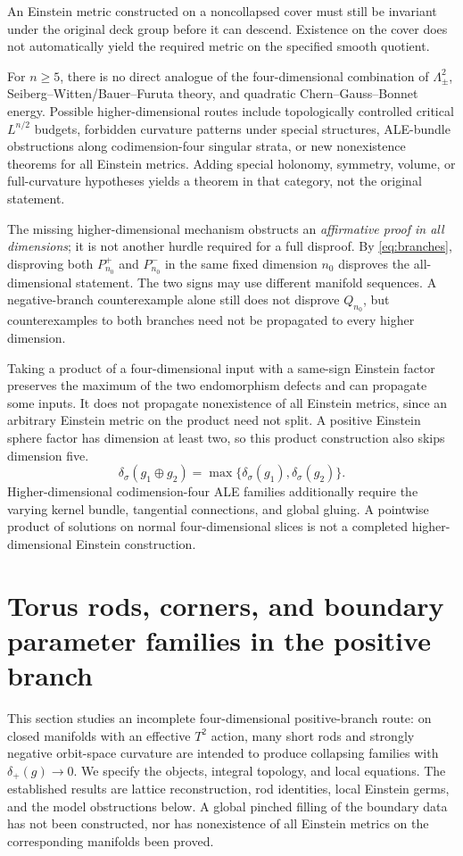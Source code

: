 \documentclass[a4paper,11pt]{article}
\numberwithin{equation}{section}
\theoremstyle{definition}
\begin{document}
An Einstein metric constructed on a noncollapsed cover must still be invariant under the original deck group before it can descend.
Existence on the cover does not automatically yield the required metric on the specified smooth quotient.

For $n\ge5$, there is no direct analogue of the four-dimensional combination of $\Lambda^2_\pm$, Seiberg--Witten/Bauer--Furuta theory, and quadratic Chern--Gauss--Bonnet energy.
Possible higher-dimensional routes include topologically controlled critical $L^{n/2}$ budgets, forbidden curvature patterns under special structures, ALE-bundle obstructions along codimension-four singular strata, or new nonexistence theorems for all Einstein metrics.
Adding special holonomy, symmetry, volume, or full-curvature hypotheses yields a theorem in that category, not the original statement.

The missing higher-dimensional mechanism obstructs an \emph{affirmative proof in all dimensions}; it is not another hurdle required for a full disproof.
By \eqref{eq:branches}, disproving both $P_{n_0}^+$ and $P_{n_0}^-$ in the same fixed dimension $n_0$ disproves the all-dimensional statement.
The two signs may use different manifold sequences.
A negative-branch counterexample alone still does not disprove $Q_{n_0}$, but counterexamples to both branches need not be propagated to every higher dimension.

Taking a product of a four-dimensional input with a same-sign Einstein factor preserves the maximum of the two endomorphism defects and can propagate some inputs.
It does not propagate nonexistence of all Einstein metrics, since an arbitrary Einstein metric on the product need not split.
A positive Einstein sphere factor has dimension at least two, so this product construction also skips dimension five.
\begin{equation}\label{eq:product-defect-global}
 \delta_\sigma(g_1\oplus g_2)
 =\max\{\delta_\sigma(g_1),\delta_\sigma(g_2)\}.
\end{equation}
Higher-dimensional codimension-four ALE families additionally require the varying kernel bundle, tangential connections, and global gluing.
A pointwise product of solutions on normal four-dimensional slices is not a completed higher-dimensional Einstein construction.

\section{Torus rods, corners, and boundary parameter families in the positive branch}\label{sec:toric-rods}
This section studies an incomplete four-dimensional positive-branch route: on closed manifolds with an effective $T^2$ action, many short rods and strongly negative orbit-space curvature are intended to produce collapsing families with $\delta_+(g)\to0$.
We specify the objects, integral topology, and local equations.
The established results are lattice reconstruction, rod identities, local Einstein germs, and the model obstructions below.
A global pinched filling of the boundary data has not been constructed, nor has nonexistence of all Einstein metrics on the corresponding manifolds been proved.
\end{document}
